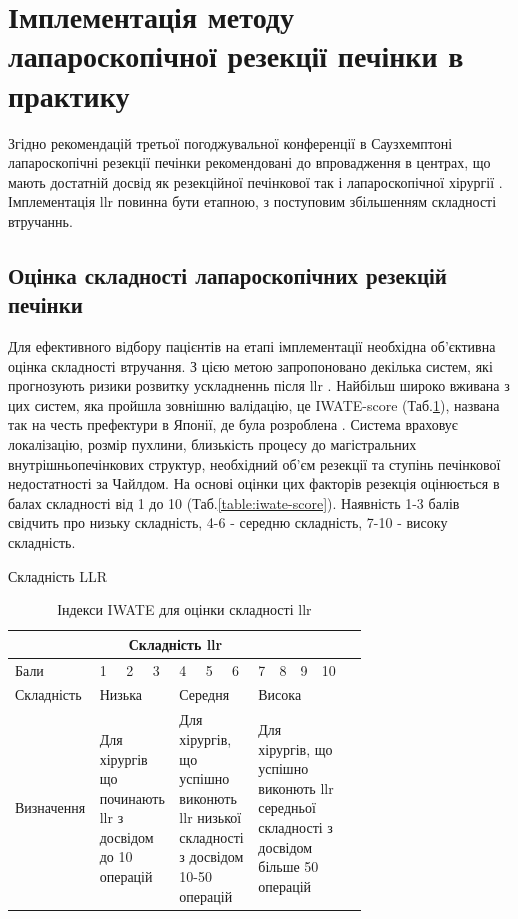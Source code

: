 \section{Імплементація методу лапароскопічної резекції печінки в практику}

Згідно рекомендацій третьої погоджувальної конференції в Саузхемптоні лапароскопічні резекції печінки рекомендовані до впровадження в центрах, що мають достатній досвід як резекційної печінкової так і лапароскопічної хірургії \cite{AbuHilal2017a}. Імплементація \acrshort{llr} повинна бути етапною, з поступовим збільшенням складності втручаннь. 

\subsection{Оцінка складності лапароскопічних резекцій печінки}
Для ефективного відбору пацієнтів на етапі імплементації необхідна об'єк\-тивна оцінка складності втручання. З цією метою запропоновано декілька систем, які прогнозують ризики розвитку ускладненнь після \acrshort{llr} \cite{Kawaguchi2018, Hasegawa2017a}. Найбільш широко вживана з цих систем, яка пройшла зовнішню валідацію, це IWATE-score (Таб.\ref{table:iwate}), названа так на честь префектури в Японії, де була розроблена \cite{Ban2014}. Система враховує локалізацію, розмір пухлини, близькість процесу до магістральних внутрішньопечінкових структур, необхідний об'єм резекції та  ступінь печінкової недостатності за Чайлдом. На основі оцінки цих факторів резекція оцінюється в балах складності від 1 до 10 (Таб.\ref{table:iwate-score}). Наявність 1-3 балів свідчить про низьку складність, 4-6 - середню складність, 7-10 - високу складність. 

Складність LLR
\begin{table}
\begin{tabular}{ |p{0.15\linewidth} |p{0.05\linewidth} |p{0.05\linewidth}|p{0.05\linewidth}|p{0.05\linewidth}|p{0.05\linewidth}|p{0.05\linewidth}|p{0.05\linewidth}|p{0.05\linewidth}|p{0.05\linewidth}|p{0.05\linewidth}|p{0.05\linewidth}| }
\hline
\multicolumn{11}{|c|}{Складність \acrshort{llr}} \\
\hline
Бали & 1 & 2 & 3 & 4 & 5 & 6 & 7 & 8 & 9 & 10 \\
\hline
Складність   & \multicolumn{3}{p{0.15\linewidth}|}{Низька} & \multicolumn{3}{p{0.15\linewidth}|}{Середня} & \multicolumn{4}{p{0.20\linewidth}|}{Висока} \\
\hline
Визначення   & \multicolumn{3}{p{0.20\linewidth}|}{Для хірургів що починають \acrshort{llr} з досвідом до 10 операцій} & \multicolumn{3}{p{0.20\linewidth}|}{Для хірургів, що успішно виконють \acrshort{llr} низької складності з досвідом 10-50 операцій } & \multicolumn{4}{p{0.25\linewidth}|}{Для хірургів, що успішно виконють \acrshort{llr} середньої складності з досвідом більше 50 операцій } \\
\hline
\end{tabular}

\caption{\label{table:iwate}Індекси IWATE для оцінки складності \acrshort{llr} }
\end{table}





